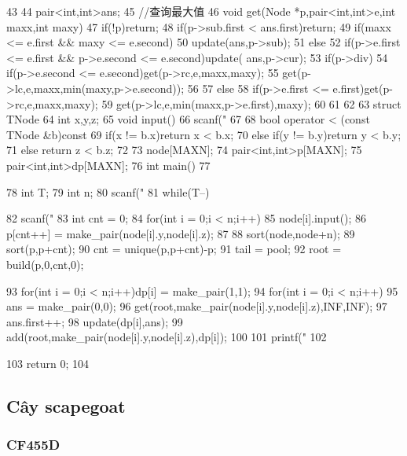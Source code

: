 \documentclass[11pt]{article}
\begin{document}
\begin{Code}
{43   }
44   pair<int,int>ans;
45   //查询最大值
46   void get(Node *p,pair<int,int>e,int maxx,int maxy){
47       if(!p)return;
48       if(p->sub.first < ans.first)return;
49       if(maxx <= e.first && maxy <= e.second)
50           update(ans,p->sub);
51       else {
52           if(p->e.first <= e.first && p->e.second <= e.second)update(
                ans,p->cur);
53           if(p->div){
54                if(p->e.second <= e.second)get(p->rc,e,maxx,maxy);
55                get(p->lc,e,maxx,min(maxy,p->e.second));
56           }
57           else {
58                if(p->e.first <= e.first)get(p->rc,e,maxx,maxy);
59                get(p->lc,e,min(maxx,p->e.first),maxy);
60           }
61       }
62   }
63   struct TNode{
64       int x,y,z;
65       void input(){
66           scanf("%
67       }
68       bool operator < (const TNode &b)const{
69           if(x != b.x)return x < b.x;
70           else if(y != b.y)return y < b.y;
71           else return z < b.z;
72       }
73   }node[MAXN];
74   pair<int,int>p[MAXN];
75   pair<int,int>dp[MAXN];
76   int main()
77   {
78       int T;
79       int n;
80       scanf("%
81       while(T--){
82           scanf("%
83           int cnt = 0;
84           for(int i = 0;i < n;i++){
85                node[i].input();
86                p[cnt++] = make_pair(node[i].y,node[i].z);
87           }
88           sort(node,node+n);
89           sort(p,p+cnt);
90           cnt = unique(p,p+cnt)-p;
91           tail = pool;
92           root = build(p,0,cnt,0);


 93            for(int i = 0;i < n;i++)dp[i] = make_pair(1,1);
 94            for(int i = 0;i < n;i++){
 95                ans = make_pair(0,0);
 96                get(root,make_pair(node[i].y,node[i].z),INF,INF);
 97                ans.first++;
 98                update(dp[i],ans);
 99                add(root,make_pair(node[i].y,node[i].z),dp[i]);
100            }
101            printf("%
102       }
103       return 0;
104 }
\end{Code}

\subsection{Cây scapegoat}

\subsubsection{CF455D}
\end{document}

